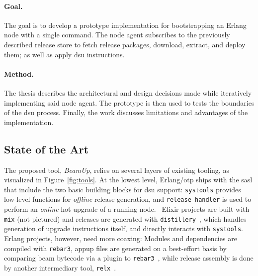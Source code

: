 \paragraph{Goal.} The goal is to develop a prototype implementation for bootstrapping an Erlang node with a single command. The node agent subscribes to the previously described release store to fetch release packages, download, extract, and deploy them; as well as apply \acrshort{dsu} instructions.

\paragraph{Method.} The thesis describes the architectural and design decisions made while iteratively implementing said node agent. The prototype is then used to tests the boundaries of the \acrshort{dsu} process. Finally, the work discusses limitations and advantages of the implementation.

\cleardoublepage
\subsection{State of the Art}\label{sec:sota}

The proposed tool, \emph{BeamUp}, relies on several layers of existing tooling, as visualized in Figure~\ref{fig:tools}. At the lowest level, Erlang/\acrshort{otp} ships with the \acrfull{sasl} that include the two basic building blocks for \acrshort{dsu} support: \lstinline|systools| provides low-level functions for \emph{offline} release generation, and \lstinline|release_handler| is used to perform an \emph{online} hot upgrade of a running node.~\cite{doc:otp}
Elixir projects are built with \lstinline|mix| (not pictured) and releases are generated with \lstinline|distillery|~\cite{distillery}, which handles generation of upgrade instructions itself, and directly interacts with \lstinline|systools|. Erlang projects, however, need more coaxing: Modules and dependencies are compiled with \lstinline|rebar3|, \acrfull{appup} files are generated on a best-effort basis by comparing \acrshort{beam} bytecode via a plugin to \lstinline|rebar3|~\cite{rebar3appup}, while release assembly is done by another intermediary tool, \lstinline|relx|~\cite{loder2016production}.

